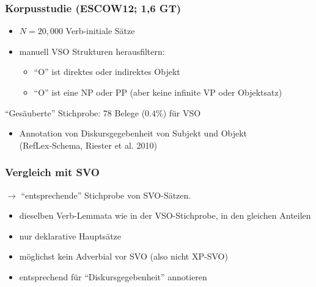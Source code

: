 \begin{frame}
  \frametitle{Korpusstudie (ESCOW12; 1,6 GT)}
  
  \begin{itemize}
    \item $N=20,000$ Verb-initiale Sätze   
    \item manuell VSO Strukturen herausfiltern:\\
      \begin{itemize}
      \item ``O'' ist direktes oder indirektes Objekt
      \item ``O'' ist eine NP oder PP (aber keine infinite VP oder Objektsatz)
      \end{itemize}
\end{itemize}
\pause

``Gesäuberte'' Stichprobe: 78 Belege ($0.4\%$) für VSO

\begin{itemize}
    \item Annotation von Diskursgegebenheit von Subjekt und Objekt\\
          (RefLex-Schema, Riester et al. 2010)
  \end{itemize}
\end{frame}

\begin{frame}
  \frametitle{Vergleich mit SVO}

$\rightarrow$ ``entsprechende'' Stichprobe von SVO-Sätzen.  

  \begin{itemize}
    \item dieselben Verb-Lemmata wie in der VSO-Stichprobe, in den gleichen Anteilen
    \item nur deklarative Hauptsätze
    \item möglichst kein Adverbial vor SVO (also nicht XP-SVO) 
    \item entsprechend für ``Diskursgegebenheit'' annotieren
  \end{itemize}
\end{frame}


